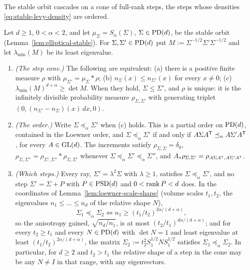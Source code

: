 The stable orbit cascades on a cone of full-rank steps, the steps whose \Levy{} densities
\ref{eq:stable-levy-density} are ordered.

\begin{proposition}\label{prop:stable-step-cone}
Let $d \ge 1$, $0 < \alpha < 2$, and let $\mu_\Sigma = S_\alpha(\Sigma)$, $\Sigma \in \mathrm{PD}(d)$, be the
stable orbit (Lemma~\ref{lem:elliptical-stable}). For $\Sigma, \Sigma' \in \mathrm{PD}(d)$ put
$M := \Sigma^{-1/2}\Sigma'\Sigma^{-1/2}$ and let $\lambda_{\min}(M)$ be its least eigenvalue.
\begin{enumerate}
\item \emph{(The step cone.)} The following are equivalent:
(a) there is a positive finite measure $\rho$ with $\mu_{\Sigma'} = \mu_\Sigma * \rho$;
(b) $n_\Sigma(x) \le n_{\Sigma'}(x)$ for every $x \ne 0$;
(c) $\lambda_{\min}(M)^{d+\alpha} \ge \det M$.
When they hold, $\Sigma \le \Sigma'$, and $\rho$ is unique: it is the infinitely divisible probability
measure $\rho_{\Sigma,\Sigma'}$ with generating triplet $(0, (n_{\Sigma'} - n_\Sigma)(x)\,dx, 0)$.
\item \emph{(The order.)} Write $\Sigma \preceq_\alpha \Sigma'$ when (c) holds. This is a partial order
on $\mathrm{PD}(d)$, contained in the Loewner order, and $\Sigma \preceq_\alpha \Sigma'$ if and only if
$A\Sigma A^{\mathsf{T}} \preceq_\alpha A\Sigma'A^{\mathsf{T}}$, for every $A \in \mathrm{GL}(d)$. The increments satisfy
$\rho_{\Sigma,\Sigma} = \delta_0$, $\rho_{\Sigma,\Sigma''} = \rho_{\Sigma',\Sigma''} * \rho_{\Sigma,\Sigma'}$
whenever $\Sigma \preceq_\alpha \Sigma' \preceq_\alpha \Sigma''$, and
$A_*\rho_{\Sigma,\Sigma'} = \rho_{A\Sigma A^{\mathsf{T}},A\Sigma'A^{\mathsf{T}}}$.
\item \emph{(Which steps.)} Every ray, $\Sigma' = \lambda^2\Sigma$ with $\lambda \ge 1$, satisfies
$\Sigma \preceq_\alpha \Sigma'$, and no step $\Sigma' = \Sigma + P$ with $P \in \mathrm{PSD}(d)$ and
$0 < \operatorname{rank} P < d$ does. In the coordinates of Lemma~\ref{lem:loewner-scale-shape} (volume scales $t_1, t_2$,
the eigenvalues $n_1 \le \dots \le n_d$ of the relative shape $N$),
\[
  \Sigma_1 \preceq_\alpha \Sigma_2 \Longleftrightarrow n_1 \ge (t_1/t_2)^{2\alpha/(d+\alpha)} ,
\]
so the anisotropy gained, $\sqrt{n_d/n_1}$, is at most $(t_2/t_1)^{d\alpha/(d+\alpha)}$; and for
every $t_2 \ge t_1$ and every $N \in \mathrm{PD}(d)$ with $\det N = 1$ and least eigenvalue at least
$(t_1/t_2)^{2\alpha/(d+\alpha)}$, the matrix $\Sigma_2 := t_2^2S_1^{1/2}NS_1^{1/2}$ satisfies
$\Sigma_1 \preceq_\alpha \Sigma_2$. In particular, for $d \ge 2$ and $t_2 > t_1$ the relative shape
of a step in the cone may be any $N \ne I$ in that range, with any eigenvectors.
\end{enumerate}
\end{proposition}

